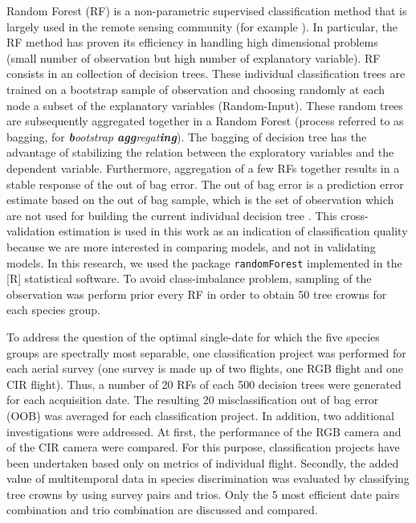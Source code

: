 \documentclass[remotesensing,article,submit,moreauthors,pdftex,12pt,a4paper]{mdpi} %
\begin{document}
Random Forest (RF) is a non-parametric supervised classification method that is largely used in the remote sensing community (for example \cite{stumpf_object-oriented_2011,burkholder_seasonal_2011,immitzer_tree_2012, zhu_continuous_2014}). 
In particular, the RF method has proven its efficiency in handling high dimensional problems \cite{genuer_variable_2010} (small number of observation but high number of explanatory variable). 
RF consists in an collection of decision trees. 
These individual classification trees are trained on a bootstrap sample of observation and choosing randomly at each node a subset of the explanatory variables (Random-Input). 
These random trees are subsequently aggregated together in a Random Forest (process referred to as bagging, for \textit{\textbf{b}ootstrap \textbf{agg}regat\textbf{ing}}). 
The bagging of decision tree has the advantage of stabilizing the relation between the exploratory variables and the dependent variable. 
Furthermore, aggregation of a few RFs together results in a stable response of the out of bag error. 
The out of bag error is a prediction error estimate based on the out of bag sample, which is the set of observation which are not used for building the current individual decision tree \cite{genuer_variable_2010}. 
This cross-validation estimation is used in this work as an indication of classification quality because we are more interested in comparing models, and not in validating models. 
In this research, we used the package {\tt randomForest} \cite{liaw_classification_2002} implemented in the [R] statistical software. 
To avoid class-imbalance problem, sampling of the observation was perform prior every RF in order to obtain 50 tree crowns for each species group. 

To address the question of the optimal single-date for which the five species groups are spectrally most separable, one classification project was performed for each aerial survey (one survey is made up of two flights, one RGB flight and one CIR flight). 
Thus, a number of 20 RFs of each 500 decision trees were generated for each acquisition date.
The resulting 20 misclassification out of bag error (OOB) was averaged for each classification project. 
In addition, two additional investigations were addressed. 
At first, the performance of the RGB camera and of the CIR camera were compared. 
For this purpose, classification projects have been undertaken based only on metrics of individual flight. 
Secondly, the added value of multitemporal data in species discrimination was evaluated by classifying tree crowns by using survey pairs and trios.
Only the 5 most efficient date pairs combination and trio combination are discussed and compared.
\end{document}
